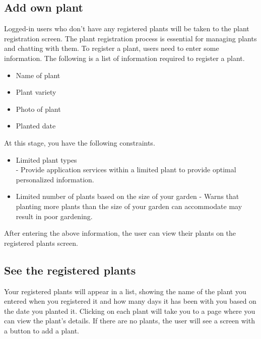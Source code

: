 \documentclass[conference, a4paper]{IEEEtran}
\begin{document}
\subsection{Add own plant}
Logged-in users who don't have any registered plants will be taken to the plant registration screen. The plant registration process is essential for managing plants and chatting with them. To register a plant, users need to enter some information. The following is a list of information required to register a plant.
\begin{itemize}
    \item Name of plant
    \item Plant variety
    \item Photo of plant
    \item Planted date
\end{itemize}
At this stage, you have the following constraints. \\
\begin{itemize}
    \item Limited plant types 
    \\ - Provide application services within a limited plant to provide optimal personalized information.\\
    \item Limited number of plants based on the size of your garden - Warns that planting more plants than the size of your garden can accommodate may result in poor gardening.\\
\end{itemize}
After entering the above information, the user can view their plants on the registered plants screen. \\
\subsection{See the registered plants}
Your registered plants will appear in a list, showing the name of the plant you entered when you registered it and how many days it has been with you based on the date you planted it. Clicking on each plant will take you to a page where you can view the plant's details. If there are no plants, the user will see a screen with a button to add a plant.\\
\end{document}
